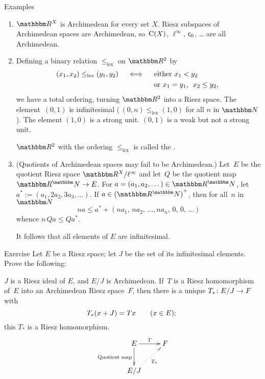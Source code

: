 \documentclass[main.tex]{subfiles}
\begin{document}
\begin{psec}{3.3}{Examples}
\begin{enumerate}
\item \label{3.3-1}
$\R^X$ is Archimedean for every set $X$.
Riesz subspaces of Archimedean spaces are Archimedean,
so~$\mathrm{C}(X)$, $\ell^\infty$, $\mathsf{c}_0$, \ldots{} 
are all Archimedean.
%
\item \label{3.3-2}%
\newcommand{\leqlex}{\leq_{\mathrm{lex}}}
Defining a binary relation $\leqlex$ on $\R^2$ by
\begin{align*}
(x_1,x_2) \leqlex (y_1,y_2)   \quad \iff \quad
& \htam{ either }x_1<y_2 \\
& \htam{ or }x_1 = y_1\htam{, }\ x_2 \leq y_2\htam{, }
\end{align*}
we have a total ordering,
turning $\R^2$ into a Riesz space.
The element~$(0,1)$ is infinitesimal
(\,$(0,n)\leqlex(1,0)$ for all $n$ in $\N$).
The element $(1,0)$ is a strong unit.
$(0,1)$ is a weak but not a strong unit.

$\R^2$ with the ordering $\leqlex$ is called
the .
%
\item \label{3.3-3}%
(Quotients of Archimedean spaces may fail to be Archimedean.)
Let~$E$ be the quotient Riesz space $\R^X / \ell^\infty$
and let~$Q$ be the quotient map $\R^\N\ra E$.
For $a=(a_1, a_2, \dotsc)\in \R^\N$,
let $a^* := (a_1,2a_2,3a_3,\dotsc)$.
If $a\in \smash{{(\R^\N)}^+}$, then for all~$n$ in~$\N$
\begin{equation*}
na \leq a^* + (na_1,\, na_2,\, \dotsc, na_n,\, 0,\, 0,\, \dotsc)
\end{equation*}
whence $n\, Qa\leq Qa^*$.

It follows that all elements of $E$ are infinitesimal.
\end{enumerate}
\end{psec}
%
%
\begin{psec}{3.4}{Exercise}
Let $E$ be a Riesz space;
let $J$ be the set of its infinitesimal elements.
Prove the following:

$J$ is a Riesz ideal of $E$, 
and $E/J$ is Archimedean.
If~$T$ is a Riesz homomorphism of~$E$
into an Archimedean Riesz  space~$F$,
then there is a unique
$T_*\colon E/J\rightarrow F$ with
\begin{equation*}
T_*(x+J) = Tx \qquad (x\in E)\text{; }
\end{equation*}
this $T_*$ is a Riesz homomorphism.
\begin{equation*}
\xymatrix{
 E \ar[d]_{\htam{Quotient map}}\ar[r]^T & F \\
 E/J\ar@{.>}[ru]_{T_*} &
}
\end{equation*}
\end{psec}
\end{document}
